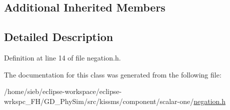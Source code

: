 \subsection*{Additional Inherited Members}


\subsection{Detailed Description}


Definition at line 14 of file negation.\-h.



The documentation for this class was generated from the following file\-:\begin{DoxyCompactItemize}
\item 
/home/sieb/eclipse-\/workspace/eclipse-\/wrkspc\-\_\-\-F\-H/\-G\-D\-\_\-\-Phy\-Sim/src/kissms/component/scalar-\/one/\hyperlink{negation_8h}{negation.\-h}\end{DoxyCompactItemize}
